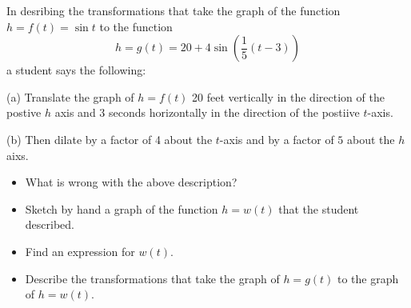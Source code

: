 \documentclass{ximera}
\begin{document}
\begin{example} \label{Ex5:Graphs}
In desribing the transformations that take the graph of the function $h = f(t) = \sin t$ to the function
\[
  h= g(t) = 20 + 4 \sin \left( \frac{1}{5}(t-3) \right) 
\]
a student says the following:

(a) Translate the graph of $h=f(t)$ 20 feet vertically in the direction of the postive $h$ axis and $3$ seconds horizontally in the direction of the postiive $t$-axis.

(b) Then dilate by a factor of 4 about the $t$-axis and by a factor of $5$ about the $h$ aixs.
\end{example}

\begin{itemize}
\item{What is wrong with the above description?}

\item{Sketch by hand a graph of the function $h=w(t)$ that the student described.}

\item{Find an expression for $w(t)$.}

\item{Describe the transformations that take the graph of $h=g(t)$ to the graph of $h=w(t)$.}

\end{itemize}
\end{document}
